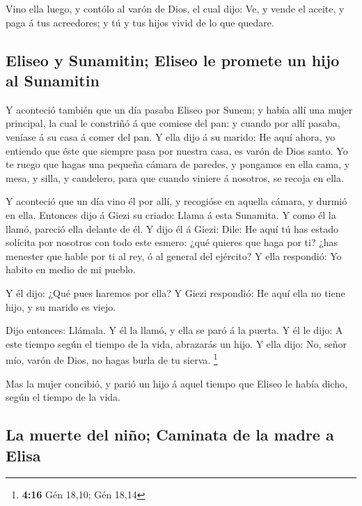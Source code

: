  Vino ella luego, y contólo al varón de Dios, el cual dijo:
Ve, y vende el aceite, y paga á tus acreedores; y tú y tus hijos vivid
de lo que quedare.

\hypertarget{eliseo-y-sunamitin-eliseo-le-promete-un-hijo-al-sunamitin}{%
\subsection{Eliseo y Sunamitin; Eliseo le promete un hijo al
Sunamitin}\label{eliseo-y-sunamitin-eliseo-le-promete-un-hijo-al-sunamitin}}

 Y aconteció también que un día pasaba Eliseo por Sunem; y
había allí una mujer principal, la cual le constriñó á que comiese del
pan: y cuando por allí pasaba, veníase á su casa á comer del pan.
 Y ella dijo á su marido: He aquí ahora, yo entiendo que
éste que siempre pasa por nuestra casa, es varón de Dios santo.
 Yo te ruego que hagas una pequeña cámara de paredes, y
pongamos en ella cama, y mesa, y silla, y candelero, para que cuando
viniere á nosotros, se recoja en ella.

 Y aconteció que un día vino él por allí, y recogióse en
aquella cámara, y durmió en ella.  Entonces dijo á Giezi su
criado: Llama á esta Sunamita. Y como él la llamó, pareció ella delante
de él.  Y dijo él á Giezi: Dile: He aquí tú has estado
solícita por nosotros con todo este esmero: ¿qué quieres que haga por
ti? ¿has menester que hable por ti al rey, ó al general del ejército? Y
ella respondió: Yo habito en medio de mi pueblo.

 Y él dijo: ¿Qué pues haremos por ella? Y Giezi respondió:
He aquí ella no tiene hijo, y su marido es viejo.

 Dijo entonces: Llámala. Y él la llamó, y ella se paró á la
puerta.  Y él le dijo: A este tiempo según el tiempo de la
vida, abrazarás un hijo. Y ella dijo: No, señor mío, varón de Dios, no
hagas burla de tu sierva. \footnote{\textbf{4:16} Gén 18,10; Gén 18,14}

 Mas la mujer concibió, y parió un hijo á aquel tiempo que
Eliseo le había dicho, según el tiempo de la vida.

\hypertarget{la-muerte-del-niuxf1o-caminata-de-la-madre-a-elisa}{%
\subsection{La muerte del niño; Caminata de la madre a
Elisa}\label{la-muerte-del-niuxf1o-caminata-de-la-madre-a-elisa}}

